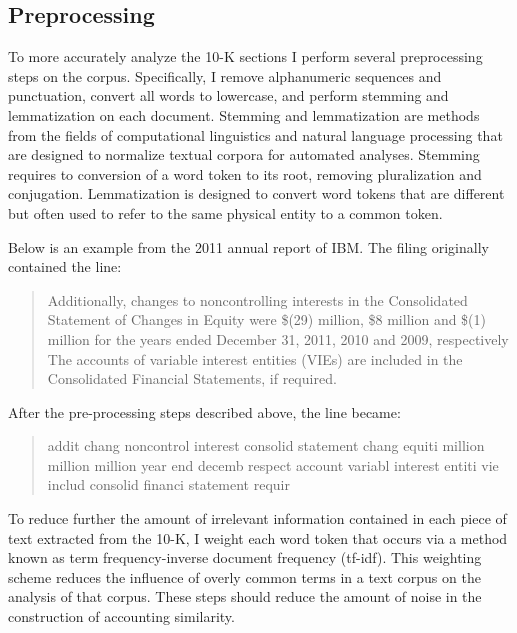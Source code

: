 \documentclass[thesis]{thesis-umich}
\begin{document}
\subsection{Preprocessing}\label{ssec:preprocess}
To more accurately analyze the 10-K sections I perform several preprocessing steps on the corpus. Specifically, I remove alphanumeric sequences and punctuation, convert all words to lowercase, and perform stemming and lemmatization on each document.
Stemming and lemmatization are methods from the fields of computational linguistics and natural language processing that are designed to normalize textual corpora for automated analyses. Stemming requires to conversion of a word token to its root, removing pluralization and conjugation. Lemmatization is designed to convert word tokens that are different but often used to refer to the same physical entity to a common token. 

Below is an example from the 2011 annual report of IBM. The filing originally contained the line:

\begin{quote}
Additionally, changes to noncontrolling interests in the Consolidated Statement of Changes in Equity were \$(29) million, \$8 million and \$(1) million for the years ended December 31, 2011, 2010 and 2009, respectively
The accounts of variable interest entities (VIEs) are included in the Consolidated Financial Statements, if required.
\end{quote}

After the pre-processing steps described above, the line became:

\begin{quote}
addit chang noncontrol interest consolid statement chang equiti million million million year end decemb respect account variabl interest entiti vie includ consolid financi statement requir
\end{quote}

To reduce further the amount of irrelevant information contained in each piece of text extracted from the 10-K, I weight each word token that occurs via a method known as term frequency-inverse document frequency (tf-idf). This weighting scheme reduces the influence of overly common terms in a text corpus on the analysis of that corpus. These steps should reduce the amount of noise in the construction of accounting similarity.
\end{document}
